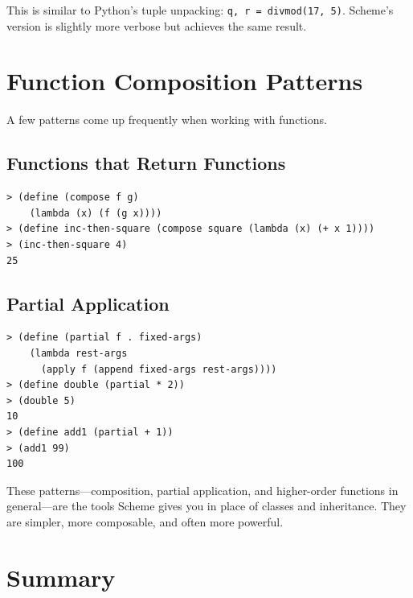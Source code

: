\begin{note}
This is similar to Python's tuple unpacking: \texttt{q, r = divmod(17, 5)}. Scheme's version is slightly more verbose but achieves the same result.
\end{note}

\section{Function Composition Patterns}

A few patterns come up frequently when working with functions.

\subsection{Functions that Return Functions}

\begin{lstlisting}[style=repl]
> (define (compose f g)
    (lambda (x) (f (g x))))
> (define inc-then-square (compose square (lambda (x) (+ x 1))))
> (inc-then-square 4)
25
\end{lstlisting}

\subsection{Partial Application}

\begin{lstlisting}[style=repl]
> (define (partial f . fixed-args)
    (lambda rest-args
      (apply f (append fixed-args rest-args))))
> (define double (partial * 2))
> (double 5)
10
> (define add1 (partial + 1))
> (add1 99)
100
\end{lstlisting}

These patterns---composition, partial application, and higher-order functions in general---are the tools Scheme gives you in place of classes and inheritance. They are simpler, more composable, and often more powerful.

\section*{Summary}

